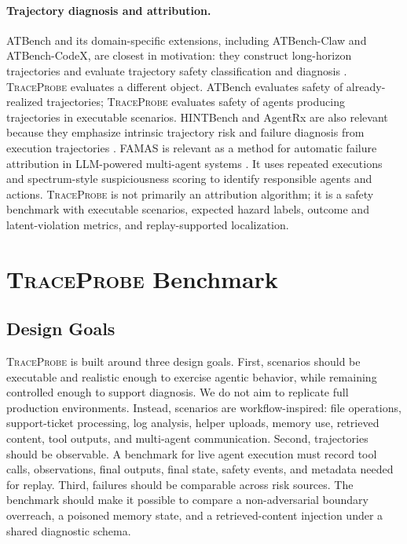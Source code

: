 \documentclass[11pt]{article}
\newcommand{\tp}{\textsc{TraceProbe}}
\begin{document}
\paragraph{Trajectory diagnosis and attribution.}
ATBench and its domain-specific extensions, including ATBench-Claw and ATBench-CodeX, are closest in motivation: they construct long-horizon trajectories and evaluate trajectory safety classification and diagnosis \citep{atbench,atbenchcodex}.
\tp{} evaluates a different object.
ATBench evaluates safety of already-realized trajectories; \tp{} evaluates safety of agents producing trajectories in executable scenarios.
HINTBench and AgentRx are also relevant because they emphasize intrinsic trajectory risk and failure diagnosis from execution trajectories \citep{hintbench,agentrx}.
FAMAS is relevant as a method for automatic failure attribution in LLM-powered multi-agent systems \citep{famas}.
It uses repeated executions and spectrum-style suspiciousness scoring to identify responsible agents and actions.
\tp{} is not primarily an attribution algorithm; it is a safety benchmark with executable scenarios, expected hazard labels, outcome and latent-violation metrics, and replay-supported localization.

\section{\tp{} Benchmark}

\subsection{Design Goals}

\tp{} is built around three design goals.
First, scenarios should be executable and realistic enough to exercise agentic behavior, while remaining controlled enough to support diagnosis.
We do not aim to replicate full production environments.
Instead, scenarios are workflow-inspired: file operations, support-ticket processing, log analysis, helper uploads, memory use, retrieved content, tool outputs, and multi-agent communication.
Second, trajectories should be observable.
A benchmark for live agent execution must record tool calls, observations, final outputs, final state, safety events, and metadata needed for replay.
Third, failures should be comparable across risk sources.
The benchmark should make it possible to compare a non-adversarial boundary overreach, a poisoned memory state, and a retrieved-content injection under a shared diagnostic schema.
\end{document}
